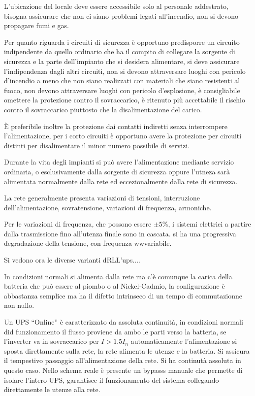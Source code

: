 L'ubicazione del locale deve essere accessibile solo al personale addestrato, 
bisogna assicurare che non ci siano problemi legati all'incendio, non si devono 
propagare fumi e gas.

Per quanto riguarda i circuiti di sicurezza è opportuno predisporre un circuito 
indipendente da quello ordinario che ha il compito di collegare la sorgente di 
sicurezza e la parte dell'impianto che si desidera alimentare, si deve 
assicurare l'indipendenza dagli altri circuiti, non si devono attraversare 
luoghi con pericolo d'incendio a meno che non siano realizzati con materiali 
che siano resistenti al fuoco, non devono attraversare luoghi con pericolo 
d'esplosione, è consigliabile omettere la protezione contro il sovraccarico, è 
ritenuto più accettabile il rischio contro il sovraccarico piuttosto che la 
disalimentazione del carico.

È preferibile inoltre la protezione dai contatti indiretti senza interrompere 
l'alimentazione, per i corto circuiti è opportuno avere la protezione per 
circuiti distinti per disalimentare il minor numero possibile di servizi.

Durante la vita degli impianti si può avere l'alimentazione mediante servizio 
ordinaria, o esclusivamente dalla sorgente di sicurezza oppure l'utneza sarà 
alimentata normalmente dalla rete ed eccezionalmente dalla rete di sicurezza.

La rete generalmente presenta variazioni di tensioni, interruzione 
dell'alimentazione, sovratensione, variazioni di frequenza, armoniche.

Per le variazioni di frequenza, che possono essere $\pm 5\%$, i sistemi 
elettrici a partire dalla trasmissione fino all'utenza finale sono in cascata.
si ha una progressiva degradazione della tensione, con frequenza wwvariabile.

Si vedono ora le diverse varianti dRLL'ups....

In condizioni normali si alimenta dalla rete ma c'è comunque la carica della 
batteria che può essere al piombo o al Nickel-Cadmio, la configurazione è 
abbastanza semplice ma ha il difetto intrinseco di un tempo di commutazionne 
non nullo.

Un UPS ``Online'' è caratterizzato da assoluta continuità, in condizioni 
normali did funzionamento il flusso proviene da ambo le parti verso la 
batteria, se l'inverter va in sovraccarico per $I>1.5I_n$ automaticamente 
l'alimentazione si sposta direttamente sulla rete, la rete alimenta le utenze e 
la batteria. Si assicura il tempestivo passaggio all'alimentazione della rete.
Si ha continutà assoluta in questo caso.
Nello schema reale è presente un bypasss manuale che permette di isolare 
l'intero UPS, garantisce il funzionamento del sistema collegando direttamente 
le utenze alla rete.

